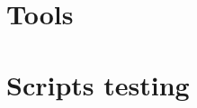 \documentclass[epsfig,a4paper,11pt,titlepage,twoside,openany]{book}
\begin{document}
      
      
      \part{Tools}
      
      
      
      \part{Scripts testing}
      
      
      
      
      
    \endgroup
\end{document}
